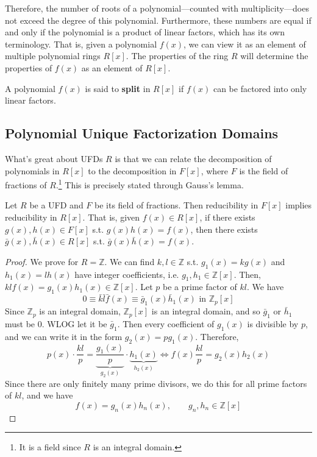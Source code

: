   Therefore, the number of roots of a polynomial---counted with multiplicity---does not exceed the degree of this polynomial. Furthermore, these numbers are equal if and only if the polynomial is a product of linear factors, which has its own terminology. That is, given a polynomial $f(x)$, we can view it as an element of multiple polynomial rings $R[x]$. The properties of the ring $R$ will determine the properties of $f(x)$ as an element of $R[x]$. 

  \begin{theorem}
    A polynomial $f(x)$ is said to \textbf{split} in $R[x]$ if $f(x)$ can be factored into only linear factors. 
  \end{theorem}

\subsection{Polynomial Unique Factorization Domains}

  What's great about UFDs $R$ is that we can relate the decomposition of polynomials in $R[x]$ to the decomposition in $F[x]$, where $F$ is the field of fractions of $R$.\footnote{It is a field since $R$ is an integral domain.} This is precisely stated through Gauss's lemma. 

  \begin{lemma}
    Let $R$ be a UFD and $F$ be its field of fractions. Then reducibility in $F[x]$ implies reducibility in $R[x]$. That is, given $f(x) \in R[x]$, if there exists $g(x), h(x) \in F[x]$ s.t. $g(x) h(x) = f(x)$, then there exists $\bar{g}(x), \bar{h}(x) \in R[x]$ s.t. $\bar{g}(x) \bar{h}(x) = f(x)$. 
  \end{lemma}
  \begin{proof}
    We prove for $R = \mathbb{Z}$. We can find $k, l \in \mathbb{Z}$ s.t. $g_1 (x) = k g(x)$ and $h_1 (x) = l h(x)$ have integer coefficients, i.e. $g_1, h_1 \in \mathbb{Z}[x]$. Then, $k l f(x) = g_1 (x) h_1 (x) \in \mathbb{Z}[x]$. Let $p$ be a prime factor of $kl$. We have 
    \begin{equation}
      0 \equiv \bar{k} \bar{l} \bar{f} (x) \equiv \bar{g}_1 (x) \bar{h}_1 (x) \text{ in } \mathbb{Z}_p [x]
    \end{equation}
    Since $\mathbb{Z}_p$ is an integral domain, $\mathbb{Z}_p [x]$ is an integral domain, and so $\bar{g}_1$ or $\bar{h}_1$ must be $0$. WLOG let it be $\bar{g}_1$. Then every coefficient of $g_1 (x)$ is divisible by $p$, and we can write it in the form $g_2(x) = p g_1 (x)$. Therefore, 
    \begin{equation}
      p(x) \cdot \frac{kl}{p} = \underbrace{\frac{g_1 (x)}{p}}_{g_2 (x)} \cdot \underbrace{h_1 (x)}_{h_2 (x)} \iff f(x) \frac{kl}{p} = g_2 (x) h_2 (x)
    \end{equation}
    Since there are only finitely many prime divisors, we do this for all prime factors of $kl$, and we have 
    \begin{equation}
      f(x) = g_n (x) h_n (x), \qquad g_n, h_n \in \mathbb{Z}[x]
    \end{equation}
  \end{proof}

